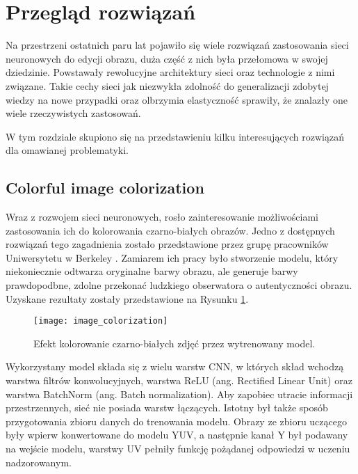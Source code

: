 \section{Przegląd rozwiązań}
  Na przestrzeni ostatnich paru lat pojawiło się wiele rozwiązań zastosowania
  sieci neuronowych do edycji obrazu, duża część z nich była przełomowa w
  swojej dziedzinie. Powstawały rewolucyjne architektury sieci oraz technologie
  z nimi związane. Takie cechy sieci jak niezwykła zdolność do generalizacji zdobytej wiedzy na nowe przypadki oraz olbrzymia elastyczność sprawiły, że
  znalazły one wiele rzeczywistych zastosowań.

  W tym rozdziale skupiono się na przedstawieniu kilku interesujących rozwiązań
  dla omawianej problematyki.

  \subsection{Colorful image colorization}

    Wraz z rozwojem sieci neuronowych, rosło zainteresowanie możliwościami zastosowania
    ich do kolorowania czarno-białych obrazów. Jedno z dostępnych rozwiązań tego
    zagadnienia zostało przedstawione przez grupę pracowników Uniwersytetu w
    Berkeley \cite{colorful_image_colorization}. Zamiarem ich pracy było stworzenie
    modelu, który niekoniecznie odtwarza oryginalne barwy obrazu, ale generuje
    barwy prawdopodbne, zdolne przekonać ludzkiego obserwatora o autentyczności
    obrazu. Uzyskane rezultaty zostały przedstawione na
    Rysunku \ref{fig:colorful_image_colorization}.

    \begin{figure}[ht]
      \centering
      \texttt{[image: image\_colorization]}
      \caption{Efekt kolorowanie czarno-białych zdjęć przez wytrenowany model.}
      \label{fig:colorful_image_colorization}
    \end{figure}

    Wykorzystany model składa się z wielu warstw CNN, w których skład wchodzą
    warstwa filtrów konwolucyjnych, warstwa ReLU (ang. Rectified
    Linear Unit) oraz warstwa BatchNorm (ang. Batch normalization).
    Aby zapobiec utracie informacji przestrzennych, sieć nie posiada warstw łączących.
    Istotny był także sposób
    przygotowania zbioru danych do trenowania modelu. Obrazy ze zbioru uczącego
    były wpierw konwertowane do modelu YUV, a następnie kanał Y był podawany na
    wejście modelu, warstwy UV pełniły funkcję pożądanej odpowiedzi w uczeniu
    nadzorowanym.


